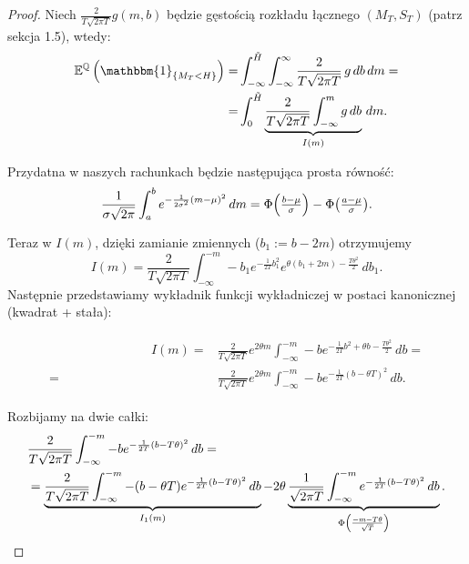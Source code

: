 \documentclass[11pt]{report}
\newcommand*{\Scale}[2][4]{\scalebox{#1}{$#2$}}%
\begin{document}
\begin{proof}
Niech $\frac{2}{T\sqrt{2\pi T}} g(m,b)$ będzie gęstością rozkładu łącznego $(M_T,S_T)$ (patrz sekcja 1.5), wtedy:
\vspace{1cm}
\begin{equation*}
\begin{split}
\mathbb{E}^{\mathbb{Q}}\left( \mathbbm{1}_{ \{ M_T<H \} } \right) = & \int_{-\infty}^{\tilde{H}} \int_{-\infty}^{\infty} \frac{2}{T\sqrt{2\pi T}}\, g \,db\,dm = \\ = & \int_{0}^{\tilde{H}} \underbrace{ \frac{2}{T\sqrt{2\pi T}} \int_{-\infty}^{m} g \,db}_{I(m)}\,dm.
\end{split}
\end{equation*}

Przydatna w naszych rachunkach będzie następująca prosta równość:
\begin{equation*}
\frac{1}{\sigma \sqrt{2\pi}}\int_{a}^{b} e^{-\frac{1}{2\sigma^2}(m - \mu )^2} \,dm = \Phi\Scale[1.0]{\left(\frac{b-\mu}{\sigma}\right)}-\Phi\Scale[1.0]{\left(\frac{a-\mu}{\sigma}\right)}.
\end{equation*}




\vspace{1cm}
Teraz w $I(m)$, dzięki zamianie zmiennych ($b_1:=b-2m$) otrzymujemy $$I(m) = \frac{2}{T\sqrt{2\pi T}} \int_{-\infty}^{-m}-b_1e^{-\frac{1}{2T}b_1^2}e^{\theta (b_1+2m)-\frac{T\theta^2}{2}}\,db_1.$$
Następnie przedstawiamy wykładnik funkcji wykładniczej w postaci kanonicznej (kwadrat + stała):

\begin{multline*}
\begin{split}
\qquad \qquad \qquad \qquad I(m) = & \frac{2}{T\sqrt{2\pi T}}e^{2\theta m}\int_{-\infty}^{-m}-be^{-\frac{1}{2T}b^2+\theta b-\frac{T\theta^2}{2}}\,db = \\ = & \frac{2}{T\sqrt{2\pi T}}e^{2\theta m}\int_{-\infty}^{-m}-be^{-\frac{1}{2T}(b-\theta T)^2}\,db.
\end{split}
\end{multline*}



Rozbijamy na dwie całki:
\begin{multline*}
\begin{split}
& \frac{2}{T\sqrt{2\pi T}} \int_{-\infty}^{-m}-be^{-\frac{1}{2T}(b - T\theta )^2}\,db = \\ & = \underbrace{ \frac{2}{T\sqrt{2\pi T}} \int_{-\infty}^{-m}-(b-\theta T)e^{-\frac{1}{2T}(b - T\theta )^2}\,db}_{I_1(m)} - 2\theta \underbrace{ \frac{1}{\sqrt{2\pi T}} \int_{-\infty}^{-m} e^{-\frac{1}{2T}(b - T\theta )^2}\,db}_{\Phi \Scale[0.8]{\left(\frac{-m-T\theta}{\sqrt{T}}\right)}}.
\end{split}
\end{multline*}
\vspace{0,2cm}


\end{proof}
\end{document}
